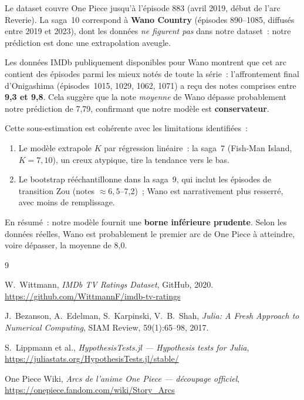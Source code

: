\documentclass[a4paper,12pt,french]{article}
\begin{document}
\begin{tcolorbox}[justif, title={La prédiction est-elle fiable~? Confrontation avec la réalité}]
Le dataset couvre One Piece jusqu'à l'épisode 883 (avril 2019, début de l'arc
Reverie). La saga~10 correspond à \textbf{Wano Country} (épisodes 890--1085,
diffusés entre 2019 et 2023), dont les données \textit{ne figurent pas} dans
notre dataset~: notre prédiction est donc une extrapolation aveugle.

Les données IMDb publiquement disponibles pour Wano montrent que cet arc contient
des épisodes parmi les mieux notés de toute la série~: l'affrontement final
d'Onigashima (épisodes~1015, 1029, 1062, 1071) a reçu des notes comprises entre
\textbf{9{,}3 et 9{,}8}. Cela suggère que la note \textit{moyenne} de Wano
dépasse probablement notre prédiction de 7{,}79, confirmant que notre modèle
est \textbf{conservateur}.

Cette sous-estimation est cohérente avec les limitations identifiées~:
\begin{enumerate}
  \item Le modèle extrapole $K$ par régression linéaire~: la saga~7 (Fish-Man
        Island, $K = 7{,}10$), un creux atypique, tire la tendance vers le bas.
  \item Le bootstrap rééchantillonne dans la saga~9, qui inclut les épisodes de
        transition Zou (notes $\approx 6{,}5$--7{,}2)~; Wano est
        narrativement plus resserré, avec moins de remplissage.
\end{enumerate}
En résumé~: notre modèle fournit une \textbf{borne inférieure prudente}.
Selon les données réelles, Wano est probablement le premier arc de One Piece
à atteindre, voire dépasser, la moyenne de 8{,}0.
\end{tcolorbox}


\newpage
\begin{thebibliography}{9}

W.~Wittmann,
\emph{IMDb TV Ratings Dataset},
GitHub, 2020.
\url{https://github.com/WittmannF/imdb-tv-ratings}

J.~Bezanson, A.~Edelman, S.~Karpinski, V.~B.~Shah,
\emph{Julia: A Fresh Approach to Numerical Computing},
SIAM Review, 59(1):65--98, 2017.

S.~Lippmann et al.,
\emph{HypothesisTests.jl — Hypothesis tests for Julia},
\url{https://juliastats.org/HypothesisTests.jl/stable/}

One Piece Wiki,
\emph{Arcs de l'anime One Piece — découpage officiel},
\url{https://onepiece.fandom.com/wiki/Story_Arcs}

\end{thebibliography}
\end{document}
